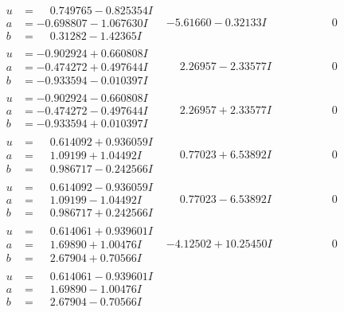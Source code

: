 \documentclass[1p]{elsarticle_modified}
\theoremstyle{definition}
\begin{document}
$$\begin{array}{c|c|c}
\begin{aligned}
u &= \phantom{-}0.749765 - 0.825354 I \\
a &= -0.698807 - 1.067630 I \\
b &= \phantom{-}0.31282 - 1.42365 I\end{aligned}
 & -5.61660 - 0.32133 I & \phantom{-0.000000 } 0 \\ \hline\begin{aligned}
u &= -0.902924 + 0.660808 I \\
a &= -0.474272 + 0.497644 I \\
b &= -0.933594 - 0.010397 I\end{aligned}
 & \phantom{-}2.26957 - 2.33577 I & \phantom{-0.000000 } 0 \\ \hline\begin{aligned}
u &= -0.902924 - 0.660808 I \\
a &= -0.474272 - 0.497644 I \\
b &= -0.933594 + 0.010397 I\end{aligned}
 & \phantom{-}2.26957 + 2.33577 I & \phantom{-0.000000 } 0 \\ \hline\begin{aligned}
u &= \phantom{-}0.614092 + 0.936059 I \\
a &= \phantom{-}1.09199 + 1.04492 I \\
b &= \phantom{-}0.986717 - 0.242566 I\end{aligned}
 & \phantom{-}0.77023 + 6.53892 I & \phantom{-0.000000 } 0 \\ \hline\begin{aligned}
u &= \phantom{-}0.614092 - 0.936059 I \\
a &= \phantom{-}1.09199 - 1.04492 I \\
b &= \phantom{-}0.986717 + 0.242566 I\end{aligned}
 & \phantom{-}0.77023 - 6.53892 I & \phantom{-0.000000 } 0 \\ \hline\begin{aligned}
u &= \phantom{-}0.614061 + 0.939601 I \\
a &= \phantom{-}1.69890 + 1.00476 I \\
b &= \phantom{-}2.67904 + 0.70566 I\end{aligned}
 & -4.12502 + 10.25450 I & \phantom{-0.000000 } 0 \\ \hline\begin{aligned}
u &= \phantom{-}0.614061 - 0.939601 I \\
a &= \phantom{-}1.69890 - 1.00476 I \\
b &= \phantom{-}2.67904 - 0.70566 I\end{aligned}

\end{array}$$
\end{document}
